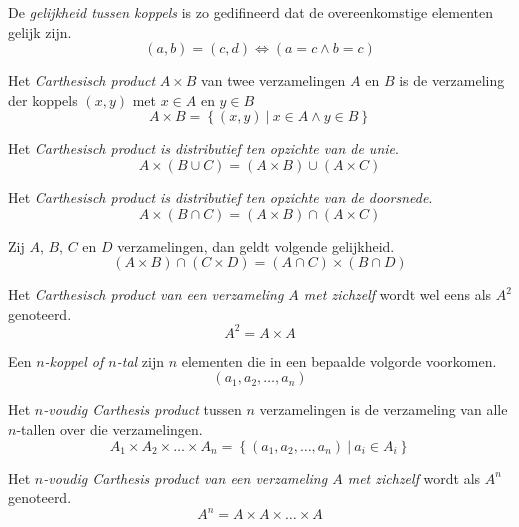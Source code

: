 \documentclass[main.tex]{subfiles}
\begin{document}
\begin{de}
  De \emph{gelijkheid tussen koppels} is zo gedifineerd dat de overeenkomstige elementen gelijk zijn.
  \[ (a,b) = (c,d) \Leftrightarrow (a = c \wedge b = c) \] 
\end{de}

\begin{de}
  Het \emph{Carthesisch product} $A \times B$ van twee verzamelingen $A$ en $B$ is de verzameling der koppels $(x,y)$ met $x \in A$ en $y \in B$
  \[ A \times B = \left\{ (x,y) \ |\ x \in A \wedge y \in B \right\} \]
\end{de}

\begin{st}
  Het \emph{Carthesisch product is distributief ten opzichte van de unie}.
  \[ A \times (B \cup C) = (A \times B) \cup (A \times C) \] 
\end{st}
\begin{st}
  Het \emph{Carthesisch product is distributief ten opzichte van de doorsnede}.
  \[ A \times (B \cap C) = (A \times B) \cap (A \times C) \] 
\end{st}

\begin{st}
  Zij $A$, $B$, $C$ en $D$ verzamelingen, dan geldt volgende gelijkheid.
  \[ (A \times B) \cap (C \times D) = (A \cap C) \times (B \cap D) \]
\end{st}

\begin{de}
  Het \emph{Carthesisch product van een verzameling $A$ met zichzelf} wordt wel eens als $A^{2}$ genoteerd.
  \[ A^{2} = A \times A \]
\end{de}

\begin{de}
  Een \emph{$n$-koppel of $n$-tal} zijn $n$ elementen die in een bepaalde volgorde voorkomen.
  \[ (a_{1}, a_{2}, \ldots, a_{n}) \]
\end{de}

\begin{de}
  Het \emph{$n$-voudig Carthesis product} tussen $n$ verzamelingen is de verzameling van alle $n$-tallen over die verzamelingen.
  \[ A_{1} \times A_{2} \times \ldots \times A_{n} = \left\{ (a_{1}, a_{2}, \ldots, a_{n}) \ |\ a_{i} \in A_{i} \right\}\]
\end{de}

\begin{de}
  Het \emph{$n$-voudig Carthesis product van een verzameling $A$ met zichzelf} wordt als $A^{n}$ genoteerd.
  \[ A^{n} = A \times A \times \ldots \times A\]
\end{de}
\end{document}
